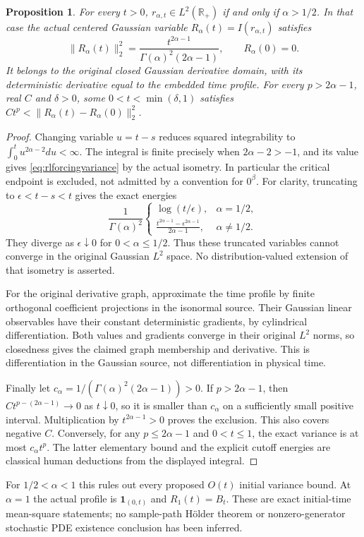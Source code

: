 \documentclass[11pt]{article}
\newtheorem{proposition}[theorem]{Proposition}
\newcommand{\R}{\mathbb R}\newcommand{\E}{\mathbb E}
\begin{document}
\begin{proposition}\label{prop:rlforcing}
For every $t>0$, $r_{\alpha,t}\in L^2(\R_+)$ if and only if
$\alpha>1/2$. In that case the actual centered Gaussian variable
$R_\alpha(t)=I(r_{\alpha,t})$ satisfies
\begin{equation}\label{eq:rlforcingvariance}
 \|R_\alpha(t)\|_2^2
 =\frac{t^{2\alpha-1}}{\Gamma(\alpha)^2(2\alpha-1)},
 \qquad R_\alpha(0)=0.
\end{equation}
It belongs to the original closed Gaussian derivative domain, with
its deterministic derivative equal to the embedded time profile.
For every $p>2\alpha-1$, real $C$ and $\delta>0$, some
$0<t<\min(\delta,1)$ satisfies
$Ct^p<\|R_\alpha(t)-R_\alpha(0)\|_2^2$.
\end{proposition}
\begin{proof}
Changing variable $u=t-s$ reduces squared integrability to
$\int_0^t u^{2\alpha-2}du<\infty$. The integral is finite precisely
when $2\alpha-2>-1$, and its value gives
\eqref{eq:rlforcingvariance} by the actual isometry. In particular the
critical endpoint is excluded, not admitted by a convention for $0^\beta$.
For clarity, truncating to $\epsilon<t-s<t$ gives the exact energies
\[
 \frac1{\Gamma(\alpha)^2}
 \begin{cases}
 \log(t/\epsilon),&\alpha=1/2,\\[2pt]
 \displaystyle\frac{t^{2\alpha-1}-\epsilon^{2\alpha-1}}{2\alpha-1},
                                      &\alpha\ne1/2.
 \end{cases}
\]
They diverge as $\epsilon\downarrow0$ for $0<\alpha\leq1/2$.
Thus these truncated variables cannot converge in the original
Gaussian $L^2$ space. No distribution-valued extension of that isometry
is asserted.

For the original derivative graph, approximate the time profile by
finite orthogonal coefficient projections in the isonormal source.
Their Gaussian linear observables have their constant deterministic
gradients, by cylindrical differentiation. Both values and gradients
converge in their original $L^2$ norms, so closedness gives the claimed
graph membership and derivative. This is differentiation in the
Gaussian source, not differentiation in physical time.

Finally let $c_\alpha=1/(\Gamma(\alpha)^2(2\alpha-1))>0$.
If $p>2\alpha-1$, then $Ct^{p-(2\alpha-1)}\to0$ as $t\downarrow0$,
so it is smaller than $c_\alpha$ on a sufficiently small positive
interval. Multiplication by $t^{2\alpha-1}>0$ proves the exclusion.
This also covers negative $C$. Conversely, for any $p\leq2\alpha-1$
and $0<t\leq1$, the exact variance is at most $c_\alpha t^p$.
The latter elementary bound and the explicit cutoff energies are
classical human deductions from the displayed integral.
\end{proof}
For $1/2<\alpha<1$ this rules out every proposed $O(t)$ initial variance
bound. At $\alpha=1$ the actual profile is $\mathbf1_{(0,t)}$ and
$R_1(t)=B_t$. These are exact initial-time mean-square statements;
no sample-path H\"older theorem or nonzero-generator stochastic PDE
existence conclusion has been inferred.
\end{document}
